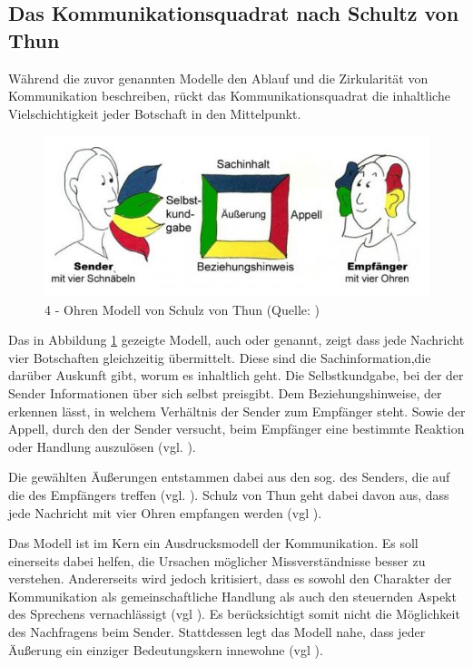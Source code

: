 \subsection{Das Kommunikationsquadrat nach Schultz von Thun}
Während die zuvor genannten Modelle den Ablauf und die Zirkularität von Kommunikation beschreiben, rückt das Kommunikationsquadrat die inhaltliche Vielschichtigkeit jeder Botschaft in den Mittelpunkt.

\begin{figure}[ht]
\centering
\includegraphics[width=1\linewidth]{content/pictures/Kommunikationsquadrat.PNG}
\caption{4 - Ohren Modell von Schulz von Thun (Quelle: \citealp{noauthor_kommunikationsquadrat_nodate})}
\label{fig:four-ears}
\end{figure}

Das in Abbildung \ref{fig:four-ears} gezeigte Modell, auch  oder  genannt, zeigt dass jede Nachricht vier Botschaften gleichzeitig übermittelt. Diese sind die Sachinformation,die darüber Auskunft gibt, worum es inhaltlich geht. Die Selbstkundgabe, bei der der Sender Informationen über sich selbst preisgibt. Dem Beziehungshinweise, der erkennen lässt, in welchem Verhältnis der Sender zum Empfänger steht. Sowie der Appell, durch den der Sender versucht, beim Empfänger eine bestimmte Reaktion oder Handlung auszulösen (vgl. \citealp{noauthor_kommunikationsquadrat_nodate}).

Die gewählten Äußerungen entstammen dabei aus den sog.  des Senders, die auf die  des Empfängers treffen (vgl. \citealp{noauthor_kommunikationsquadrat_nodate}). Schulz von Thun geht dabei davon aus, dass jede Nachricht mit vier Ohren empfangen werden (vgl \citealp[S. 23]{becker_praxishandbuch_2018}). 

Das Modell ist im Kern ein Ausdrucksmodell der Kommunikation. Es soll einerseits dabei helfen, die Ursachen möglicher Missverständnisse besser zu verstehen. Andererseits wird jedoch kritisiert, dass es sowohl den Charakter der Kommunikation als gemeinschaftliche Handlung als auch den steuernden Aspekt des Sprechens vernachlässigt (vgl \citealp[S. 23]{becker_praxishandbuch_2018}). Es berücksichtigt somit nicht die Möglichkeit des Nachfragens beim Sender. Stattdessen legt das Modell nahe, dass jeder Äußerung ein einziger  Bedeutungskern innewohne (vgl \citealp[S. 23]{becker_praxishandbuch_2018}). 

